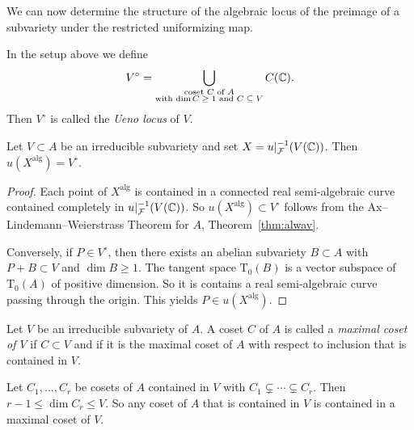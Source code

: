 We can now determine the structure of the algebraic locus of the
preimage of a subvariety under the restricted uniformizing map. 

\begin{definition}
  \label{def:ueno}
  In the setup above we define
  \begin{equation*}
    V^{\circ} = \bigcup_{\substack{\text{coset $C$ of $A$} \\\text{with $\dim
          C\ge 1$ and $C\subseteq
          V$}}} C({\mathbb{C}}).
  \end{equation*}
  Then $V^{\circ}$ is called the \emph{Ueno locus} of $V$. 
\end{definition}

\begin{theorem}
  \label{thm:imagealg}
  Let $V\subset A$ be an irreducible subvariety and set
  $X = u|_{{\mathcal F}}^{-1}(V({\mathbb{C}}))$. Then $u(X^{\mathrm{alg}}) = V^{\circ}$.
\end{theorem}
\begin{proof}
  Each point of $X^{\mathrm{alg}}$ is contained in a connected real
  semi-algebraic curve contained completely in
  $u|_{{\mathcal F}}^{-1}(V({\mathbb{C}}))$. So $u(X^{\mathrm{alg}}) \subset V^{\circ}$
  follows from the
  Ax--Lindemann--Weierstrass Theorem for $A$, Theorem~\ref{thm:alwav}.

  Conversely, if $P\in V^{\circ}$, then there exists an abelian
  subvariety $B\subset A$ with $P+B \subset V$ and $\dim B \ge 1$. The
  tangent space $\mathrm{T}_0(B)$ is a vector subspace of
  $\mathrm{T}_0(A)$ of positive dimension. So it is contains a real
  semi-algebraic curve passing through the origin. This yields
  $P\in u(X^{\mathrm{alg}})$. 
\end{proof}


\begin{definition}
  Let $V$ be an irreducible subvariety of $A$. A coset $C$ of $A$ is
  called a \emph{maximal coset of $V$} if $C\subset V$ and if it is
  the maximal coset of $A$ with respect to inclusion that is contained
  in $V$. 
\end{definition}

Let $C_1,\ldots,C_r$ be cosets of $A$ contained in $V$ with
$C_1\subsetneq \cdots\subsetneq C_r$. Then $r-1\le \dim C_r\le V$. So
any coset of $A$ that is contained in $V$ is contained in a maximal
coset of $V$.

